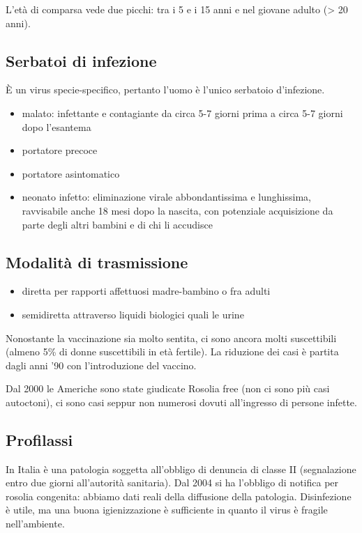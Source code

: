 L'età di comparsa vede due picchi: tra i 5 e i 15 anni e nel giovane
adulto (> 20 anni).

\subsection{Serbatoi di infezione}

È un virus specie-specifico, pertanto
l'uomo è l'unico serbatoio d'infezione.

\begin{itemize}
\item
  malato: infettante e contagiante da circa 5-7 giorni prima a circa 5-7
  giorni dopo l'esantema
\item
  portatore precoce
\item
  portatore asintomatico
\item
  neonato infetto: eliminazione virale abbondantissima e lunghissima,
  ravvisabile anche 18 mesi dopo la nascita, con potenziale acquisizione
  da parte degli altri bambini e di chi li accudisce
\end{itemize}

\subsection{Modalità di trasmissione}

\begin{itemize}
\item
diretta per rapporti affettuosi
  madre-bambino o fra adulti
\item
  semidiretta attraverso liquidi biologici quali le urine
\end{itemize}

Nonostante la vaccinazione sia molto sentita, ci sono ancora molti
suscettibili (almeno 5\% di donne suscettibili in età fertile). La
riduzione dei casi è partita dagli anni '90 con l'introduzione del
vaccino.

Dal 2000 le Americhe sono state giudicate Rosolia free (non ci sono più
casi autoctoni), ci sono casi seppur non numerosi dovuti all'ingresso di
persone infette.

\subsection{Profilassi}

In Italia è una patologia soggetta all'obbligo di denuncia di classe II
(segnalazione entro due giorni all'autorità sanitaria). Dal 2004 si ha
l'obbligo di notifica per rosolia congenita: abbiamo dati reali della
diffusione della patologia. Disinfezione è utile, ma una buona
igienizzazione è sufficiente in quanto il virus è fragile nell'ambiente.

